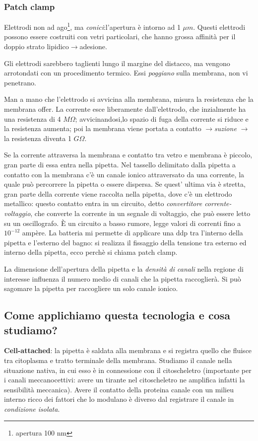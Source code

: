 \documentclass[a4paper,12pt]{article}
\newcommand{\lfreccia}{\ensuremath{\longrightarrow}}
\begin{document}
\subsubsection{Patch clamp}
Elettrodi non ad ago\footnote{apertura 100 nm}, ma \emph{conici}:l'apertura è intorno ad 1 $\mu m$. Questi elettrodi possono essere costruiti con vetri particolari, che hanno grossa affinità per il doppio strato lipidico\lfreccia adesione.

Gli elettrodi sarebbero taglienti lungo il margine del distacco, ma vengono arrotondati con un procedimento termico. Essi \emph{poggiano} sulla membrana, non vi penetrano.

Man a mano che l'elettrodo si avvicina alla membrana, misura la resistenza che la membrana offer. La corrente esce liberamente dall'elettrodo, che inzialmente ha una resistenza di 4 $M\Omega$; avvicinandosi,lo spazio di fuga della corrente si riduce e la resistenza aumenta; poi la membrana viene portata a contatto \lfreccia \emph{suzione} \lfreccia la resistenza diventa 1 $G\Omega$.

Se la corrente attraversa la membrana e contatto tra vetro e membrana è piccolo, gran parte di essa entra nella pipetta.
Nel tassello delimitato dalla pipetta a contatto con la membrana c'è un canale ionico attraversato da una corrente, la quale può percorrere la pipetta o essere dispersa. Se quest' ultima via è stretta, gran parte della corrente viene raccolta nella pipetta, dove c'è un elettrodo metallico: questo contatto entra in un circuito, detto \emph{convertitore corrente-voltaggio}, che converte la corrente in un segnale di voltaggio, che può essere letto su un oscillografo.
È un circuito a basso rumore, legge valori di correnti fino a $10^{-12}$ ampère. La batteria mi permette di applicare una ddp tra l'interno della pipetta e l'esterno del bagno: si realizza il fissaggio della tensione tra esterno ed interno della pipetta, ecco perchè si chiama patch clamp.

La dimensione dell'apertura della pipetta e la \emph{densità di canali} nella regione di interesse influenza il numero medio di canali che la pipetta raccoglierà. Si può sagomare la pipetta per raccogliere un solo canale ionico.

\subsection{Come applichiamo questa tecnologia e cosa studiamo?}

\textbf{Cell-attached}: la pipetta è saldata alla membrana e si registra quello che fluisce tra citoplasma e tratto terminale della membrana. Studiamo il canale nella situazione nativa, in cui esso è in connessione con il  citoscheletro (importante per i canali meccanocettivi: avere un tirante nel citoscheletro ne amplifica infatti la sensibilità meccanica). Avere il contatto della proteina canale con un milieu interno ricco dei fattori che lo modulano è diverso dal registrare il canale in \emph{condizione isolata}.
\end{document}
